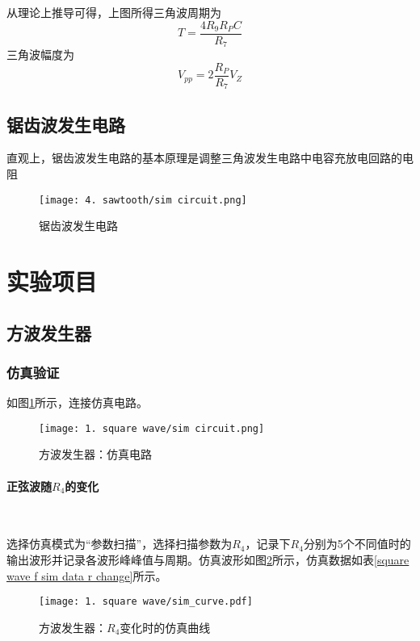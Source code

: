 \documentclass[UTF8]{ctexart}
\numberwithin{figure}{subsection}
\numberwithin{table}{subsection}
\numberwithin{equation}{subsection}
\begin{document}
\par 从理论上推导可得，上图所得三角波周期为
\[T = \frac{4R_9R_PC}{R_7}\]
三角波幅度为
\[V_{pp} = 2\frac{R_P}{R_7} V_Z\]

\subsection{锯齿波发生电路}
\par 直观上，锯齿波发生电路的基本原理是调整三角波发生电路中电容充放电回路的电阻

\begin{figure}[H]
    \begin{center}
        \caption{锯齿波发生电路}
        \texttt{[image: 4. sawtooth/sim circuit.png]}
    \end{center}
\end{figure}


\section{实验项目}
\subsection{方波发生器}
\subsubsection{仿真验证}
\par 如图\ref{square sim circuit}所示，连接仿真电路。

\begin{figure}[H]
    \begin{center}
        \caption{方波发生器：仿真电路}
        \texttt{[image: 1. square wave/sim circuit.png]}
        \label{square sim circuit}
    \end{center}
\end{figure}

\paragraph{正弦波随\(R_4\)的变化}~{}
\par 选择仿真模式为“参数扫描”，选择扫描参数为\(R_4\)，记录下\(R_4\)分别为5个不同值时的输出波形并记录各波形峰峰值与周期。仿真波形如图\ref{square sim curve r change}所示，仿真数据如表\ref{square wave f sim data r change}所示。


\begin{figure}[H]
    \begin{center}
        \caption{方波发生器：\(R_4\)变化时的仿真曲线}
        \texttt{[image: 1. square wave/sim\_curve.pdf]}
        \label{square sim curve r change}
    \end{center}
\end{figure}
\end{document}
